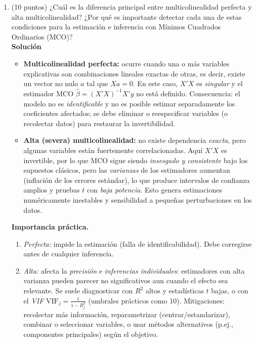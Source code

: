 \documentclass[10pt,a4paper]{article}
\begin{document}
\begin{enumerate}

\item (10 puntos) ¿Cuál es la diferencia principal entre multicolinealidad perfecta y alta multicolinealidad?
¿Por qué es importante detectar cada una de estas condiciones para la estimación e inferencia con Mínimos Cuadrados Ordinarios (MCO)?
\\
\textbf{Solución}
\begin{itemize}
    \item \textbf{Multicolinealidad perfecta:} ocurre cuando una o más variables explicativas son combinaciones lineales exactas de otras, es decir,
    existe un vector no nulo $a$ tal que $X a = 0$. En este caso, $X'X$ es \emph{singular} y el estimador MCO
    $\hat\beta = (X'X)^{-1} X'y$ no está definido. Consecuencia: el modelo no es \emph{identificable} y no es posible
    estimar separadamente los coeficientes afectados; se debe eliminar o reespecificar variables (o recolectar datos) para restaurar la invertibilidad.
    \item \textbf{Alta (severa) multicolinealidad:} no existe dependencia \emph{exacta}, pero algunas variables están fuertemente correlacionadas.
    Aquí $X'X$ es invertible, por lo que MCO sigue siendo \emph{insesgado y consistente} bajo los supuestos clásicos,
    pero las \emph{varianzas} de los estimadores aumentan (inflación de los errores estándar), lo que produce
    intervalos de confianza amplios y pruebas $t$ con \emph{baja potencia}. Esto genera estimaciones numéricamente inestables y sensibilidad a pequeñas perturbaciones en los datos.
\end{itemize}

\noindent
\textbf{Importancia práctica.}
\begin{enumerate}
    \item \emph{Perfecta:} impide la estimación (falla de identificabilidad). Debe corregirse antes de cualquier inferencia.
    \item \emph{Alta:} afecta la \emph{precisión} e \emph{inferencias individuales}: estimadores con alta varianza pueden parecer no significativos
    aun cuando el efecto sea relevante. Se suele diagnosticar con $R^2$ altos y estadísticas $t$ bajas, o con el \emph{VIF}
    $\mathrm{VIF}_j = \frac{1}{1 - R_j^2}$ (umbrales prácticos como 10).
    Mitigaciones: recolectar más información, reparametrizar (centrar/estandarizar), combinar o seleccionar variables,
    o usar métodos alternativos (p.ej., componentes principales) según el objetivo.
\end{enumerate}


\end{enumerate}
\end{document}
